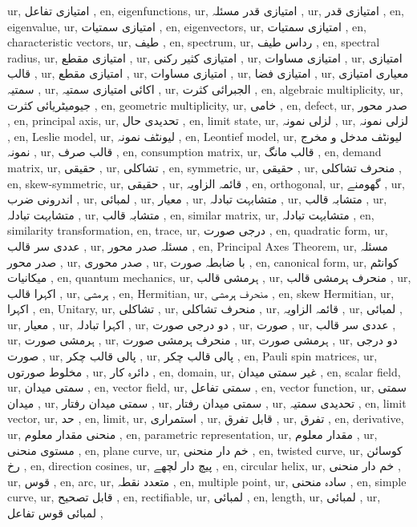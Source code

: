 ur, امتیازی تفاعل ,
en, eigenfunctions,
ur, امتیازی قدر مسئلہ ,
ur, امتیازی قدر ,
en, eigenvalue,
ur, امتیازی سمتیات ,
en, eigenvectors,
ur, امتیازی سمتیات ,
en, characteristic vectors,
ur, طیف ,
en, spectrum,
ur, رداس طیف ,
en, spectral radius,
ur, امتیازی مقطع ,
ur, امتیازی کثیر رکنی ,
ur, امتیازی مساوات ,
ur, امتیازی قالب ,
ur, امتیازی مقطع ,
ur, امتیازی مساوات ,
ur, امتیازی فضا ,
ur, معیاری امتیازی سمتیہ ,
ur, اکائی امتیازی سمتیہ ,
ur, الجبرائی کثرت ,
en, algebraic multiplicity,
ur, جیومیٹریائی کثرت ,
en, geometric multiplicity,
ur, خامی ,
en, defect,
ur, صدر محور ,
en, principal axis,
ur, تحدیدی حال ,
en, limit state,
ur, لزلی نمونہ ,
ur, لزلی نمونہ ,
en, Leslie model,
ur, لیونٹف نمونہ ,
en, Leontief model,
ur, لیونٹف مدخل و مخرج نمونہ ,
ur, قالب صرف ,
en, consumption matrix,
ur, قالب مانگ ,
en, demand matrix,
ur, حقیقی ,
ur, تشاکلی ,
en, symmetric,
ur, حقیقی ,
ur, منحرف تشاکلی ,
en, skew-symmetric,
ur, حقیقی ,
ur, قائمہ الزاویہ ,
en, orthogonal,
ur, گھومنے ,
ur, اندرونی ضرب ,
ur, لمبائی ,
ur, معیار ,
ur, متشابہت تبادلہ ,
ur, متشابہ قالب ,
ur, متشابہت تبادلہ ,
ur, متشابہ قالب ,
en, similar matrix,
ur, متشابہت تبادلہ ,
en, similarity transformation,
en, trace,
ur, درجی صورت ,
en, quadratic form,
ur, عددی سر قالب ,
ur, مسئلہ صدر محور ,
en, Principal Axes Theorem,
ur, مسئلہ صدر محور ,
ur, صدر محوری ,
ur, با ضابطہ صورت ,
en, canonical form,
ur, کوانٹم میکانیات ,
en, quantum mechanics,
ur, ہرمشی قالب ,
ur, منحرف ہرمشی قالب ,
ur, اکہرا قالب ,
ur, ہرمشی ,
en, Hermitian,
ur, منحرف ہرمشی ,
en, skew Hermitian,
ur, اکہرا ,
en, Unitary,
ur, تشاکلی ,
ur, منحرف تشاکلی ,
ur, قائمہ الزاویہ ,
ur, لمبائی ,
ur, معیار ,
ur, اکہرا تبادلہ ,
ur, دو درجی صورت ,
ur, صورت ,
ur, عددی سر قالب ,
ur, ہرمشی صورت ,
ur, منحرف ہرمشی صورت ,
ur, ہرمشی صورت ,
ur, دو درجی صورت ,
ur, پالی قالب چکر ,
ur, پالی قالب چکر ,
en, Pauli spin matrices,
ur, مخلوط صورتوں ,
ur, دائرہ کار ,
en, domain,
ur, غیر سمتی میدان ,
en, scalar field,
ur, سمتی میدان ,
en, vector field,
ur, سمتی تفاعل ,
en, vector function,
ur, سمتی میدان ,
ur, سمتی میدان رفتار ,
ur, سمتی میدان رفتار ,
ur, تحدیدی سمتیہ ,
en, limit vector,
ur, حد ,
en, limit,
ur, استمراری ,
ur, قابل تفرق ,
ur, تفرق ,
en, derivative,
ur, منحنی مقدار معلوم ,
en, parametric representation,
ur, مقدار معلوم ,
ur, مستوی منحنی ,
en, plane curve,
ur, خم دار منحنی ,
en, twisted curve,
ur, کوسائن رخ ,
en, direction cosines,
ur, پیچ دار لچھے ,
en, circular helix,
ur, خم دار منحنی ,
ur, قوس ,
en, arc,
ur, متعدد نقطہ ,
en, multiple point,
ur, سادہ منحنی ,
en, simple curve,
ur, قابل تصحیح ,
en, rectifiable,
ur, لمبائی ,
en, length,
ur, لمبائی ,
ur, لمبائی قوس تفاعل ,
